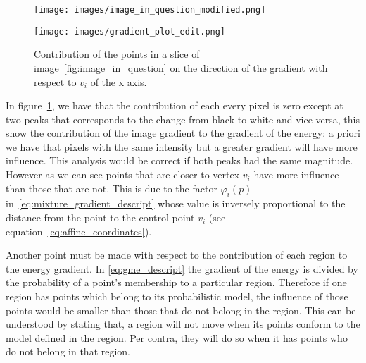 \begin{figure}[h!]
	\centering
	\begin{minipage}{0.45\textwidth}
		\centering
		{\texttt{[image: images/image\_in\_question\_modified.png]}} %
		\caption{First step of the iteration in the segmentation. The initial cage in blue, the contour in white and the next cage in green with ten times the learning rate of step 1.} \label{fig:image_in_question}
	\end{minipage}\hfill
	\begin{minipage}{0.5\textwidth}
		\centering
		{\texttt{[image: images/gradient\_plot\_edit.png]}}
		\caption{Contribution of the points in a slice of image~\ref{fig:image_in_question} on the direction of the gradient with respect to $v_i$ of the x axis.}\label{fig:plot_in_question}
	\end{minipage}
	\centering
	
\end{figure}

In figure~\ref{fig:plot_in_question}, we have that the contribution of each every pixel is zero except at two peaks that corresponds to the change from black to white and vice versa, this show the contribution of the image gradient to the gradient of the energy: a priori we have that pixels with the same intensity but a greater gradient will have more influence. This analysis would be correct if both peaks had the same magnitude. However as we can see points that are closer to vertex $v_i$ have more influence than those that are not. This is due to the factor $\varphi_i(p)$ in~\eqref{eq:mixture_gradient_descript} whose value is inversely proportional to the distance from the point to the control point $v_i$ (see equation~\eqref{eq:affine_coordinates}).

Another point must be made with respect to the contribution of each region to the energy gradient. In \eqref{eq:gme_descript} the gradient of the energy is divided by the probability of a point's membership to a particular region. Therefore if one region has points which belong to its probabilistic model, the influence of those points would be smaller than those that do not belong in the region. This can be understood by stating that, a region will not move when its points conform to the model defined in the region. Per contra, they will do so when it has points who do not belong in that region.

